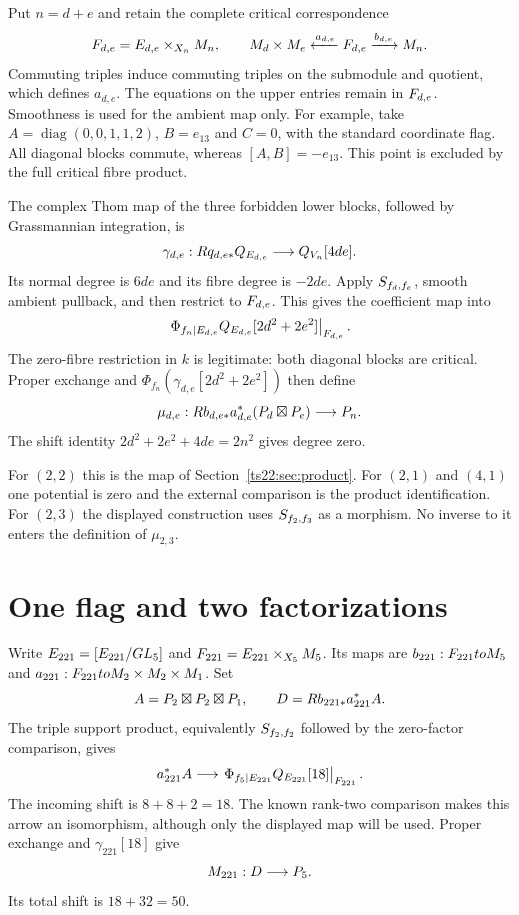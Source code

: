 Put $n=d+e$ and retain the complete critical correspondence
\[
 F_{d,e}=E_{d,e}\times_{X_n}M_n,
 \qquad
 M_d\times M_e\xleftarrow{a_{d,e}}F_{d,e}
                       \xrightarrow{b_{d,e}}M_n.
\]
Commuting triples induce commuting triples on the submodule and
quotient, which defines $a_{d,e}$. The equations on the upper
entries remain in $F_{d,e}$. Smoothness is used for the ambient
map only. For example, take $A=\operatorname{diag}(0,0,1,1,2)$,
$B=e_{13}$ and $C=0$, with the standard coordinate flag.
All diagonal blocks commute, whereas $[A,B]=-e_{13}$.
This point is excluded by the full critical fibre product.

The complex Thom map of the three forbidden lower blocks, followed
by Grassmannian integration, is
\[
 \gamma_{d,e}:Rq_{d,e*}Q_{E_{d,e}}\longrightarrow Q_{V_n}[4de].
\]
Its normal degree is $6de$ and its fibre degree is $-2de$.
Apply $S_{f_d,f_e}$, smooth ambient pullback, and then restrict to
$F_{d,e}$. This gives the coefficient map into
\[
 \left.\Phi_{f_n|E_{d,e}}
       Q_{E_{d,e}}[2d^2+2e^2]\right|_{F_{d,e}}.
\]
The zero-fibre restriction in $k$ is legitimate: both diagonal blocks
are critical. Proper exchange and
$\Phi_{f_n}(\gamma_{d,e}[2d^2+2e^2])$ then define
\[
 \mu_{d,e}:Rb_{d,e*}a_{d,e}^*(P_d\boxtimes P_e)
                             \longrightarrow P_n.
\]
The shift identity $2d^2+2e^2+4de=2n^2$ gives degree zero.

For $(2,2)$ this is the map of Section~\ref{ts22:sec:product}.
For $(2,1)$ and $(4,1)$ one potential is zero and the external
comparison is the product identification. For $(2,3)$ the displayed
construction uses $S_{f_2,f_3}$ as a morphism. No inverse to it
enters the definition of $\mu_{2,3}$.

\section{One flag and two factorizations}
\label{fl221:sec:flag}

Write $E_{221}=[E_{221}/GL_5]$ and
$F_{221}=E_{221}\times_{X_5}M_5$.
Its maps are $b_{221}:F_{221}toM_5$ and
$a_{221}:F_{221}toM_2\times M_2\times M_1$.
Set
\[
 A=P_2\boxtimes P_2\boxtimes P_1,\qquad
 D=Rb_{221*}a_{221}^*A.
\]
The triple support product, equivalently
$S_{f_2,f_2}$ followed by the zero-factor comparison, gives
\[
 a_{221}^*A\longrightarrow
 \left.\Phi_{f_5|E_{221}}Q_{E_{221}}[18]
                                             \right|_{F_{221}}.
\]
The incoming shift is $8+8+2=18$. The known rank-two comparison
makes this arrow an isomorphism, although only the displayed map
will be used. Proper exchange and $\gamma_{221}[18]$ give
\[
                      M_{221}:D\longrightarrow P_5.
\]
Its total shift is $18+32=50$.

